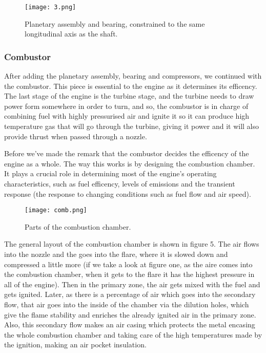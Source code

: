 \documentclass[12pt, letterpaper]{article}
\begin{document}
\begin{figure}[H]
	\centering
	\texttt{[image: 3.png]}
	\caption{Planetary assembly and bearing, constrained to the same longitudinal axis as the shaft.}
\end{figure}

\subsubsection*{Combustor}

After adding the planetary assembly, bearing and compressors, we continued with the combustor. This piece is essential to the engine as it determines its efficency. The last stage of the engine is the turbine stage, and the turbine needs to draw power form somewhere in order to turn, and so, the combustor is in charge of combining fuel with highly pressurised air and ignite it so it can produce high temperature gas that will go through the turbine, giving it power and it will also provide thrust when passed through a nozzle.

Before we've made the remark that the combustor decides the efficency of the engine as a whole. The way this works is by designing the combustion chamber. It plays a crucial role in determining most of the engine's operating characteristics, such as fuel efficency, levels of emissions and the transient response (the response to changing conditions such as fuel flow and air speed).

\begin{figure}[H]
	\centering
	\texttt{[image: comb.png]}
	\caption{Parts of the combustion chamber.}
\end{figure}

The general layout of the combustion chamber is shown in figure 5. The air flows into the nozzle and the goes into the flare, where it is slowed down and compressed a little more (if we take a look at figure one, as the aire comes into the combustion chamber, when it gets to the flare it has the highest pressure in all of the engine). Then in the primary zone, the air gets mixed with the fuel and gets ignited. Later, as there is a percentage of air which goes into the secondary flow, that air goes into the inside of the chamber via the dilution holes, which give the flame stability and enriches the already ignited air in the primary zone. Also, this secondary flow makes an air casing which protects the metal encasing the whole combustion chamber and taking care of the high temperatures made by the ignition, making an air pocket insulation.
\end{document}
